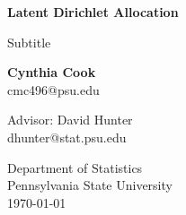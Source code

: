 \begin{titlepage}
    \begin{center}
        \vspace*{1cm}

        \Huge
        \textbf{Latent Dirichlet Allocation}

        \vspace{0.5cm}
        \LARGE
        Subtitle

        \vspace{1.5cm}

        \textbf{Cynthia Cook} \\
        \large
        cmc496@psu.edu

        \vfill

        \LARGE
        Advisor:  David Hunter \\
        \large
        dhunter@stat.psu.edu

        \vspace{0.8cm}


        \Large
        Department of Statistics\\
        Pennsylvania State University\\
        \today

    \end{center}
\end{titlepage}

